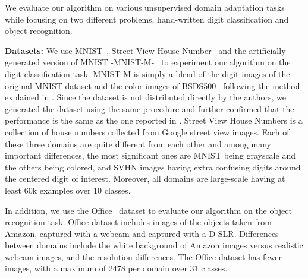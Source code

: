 We evaluate our algorithm on various unsupervised domain adaptation tasks while focusing on two different problems, hand-written digit classification and object recognition.

\vspace{2mm}
\noindent \textbf{Datasets:} We use MNIST~\cite{mnist}, Street View House Number~\cite{svhn} and the artificially generated version of MNIST -MNIST-M-~\cite{ganin15} to experiment our algorithm on the digit classification task. MNIST-M is simply a blend of the digit images of the original MNIST dataset and the color images of BSDS500~\cite{bsds500} following the method explained in \cite{ganin15}. Since the dataset is not distributed directly by the authors, we generated the dataset using the same procedure and further confirmed that the performance is the same as the one reported in \cite{ganin15}. Street View House Numbers is a collection of house numbers collected from Google street view images. Each of these three domains are quite different from each other and among many important differences, the most significant ones are MNIST being grayscale and the others being colored, and SVHN images having extra confusing digits around the centered digit of interest. Moreover, all domains are large-scale having at least 60k examples over 10 classes. 

In addition, we use the Office~\cite{office} dataset to evaluate our algorithm on the object recognition task. Office dataset includes images of the objects taken from Amazon, captured with a webcam and captured with a D-SLR. Differences between domains include the white background of Amazon images versus realistic webcam images, and the resolution differences. The Office dataset has fewer images, with a maximum of 2478 per domain over 31 classes. %


